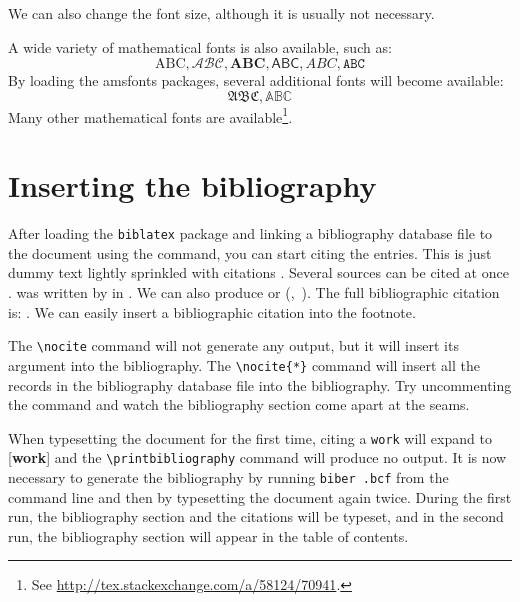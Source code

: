 \documentclass[
  digital, %
  table,   %
%
  lof,     %
  lot,     %
]{fithesis3}
\begin{document}
{\tiny We \scriptsize can \footnotesize also \small change \normalsize
the \large font \Large size, \LARGE although \huge it \Huge
is \huge usually \LARGE not \Large necessary.\normalsize

A wide variety of mathematical fonts is also available, such as: \[
  \mathrm{ABC}, \mathcal{ABC}, \mathbf{ABC}, \mathsf{ABC},
  \mathit{ABC}, \mathtt{ABC}
\] By loading the \textsf{amsfonts} packages, several additional
fonts will become available: \[
  \mathfrak{ABC}, \mathbb{ABC}
\] Many other mathematical fonts are available\footnote{
  See \url{http://tex.stackexchange.com/a/58124/70941}.
}.

\chapter{Inserting the bibliography}
After loading the \texttt{biblatex} package and linking a
bibliography data\-base file to the document using the
\verb"" command, you can start citing the entries.
This is just dummy text \cite{inbook-full} lightly sprinkled with
citations \cite[p.~123]{incollection-full}.  Several sources can be
cited at once \cite{whole-collection, manual-minimal,manual-full}.
 was written by \citeauthor{inbook-full} in
\citeyear{inbook-full}. We can also produce \textcite{inbook-full}
or%
\def\citeauthoryear#1{(\textcite{#1},~\citeyear{#1})}
\citeauthoryear{inbook-full}. The full bibliographic citation is:
\emph{}. We can easily insert a bibliographic
citation into the footnote.

The \verb"\nocite" command will not generate any
output\nocite{booklet-full}, but it will insert its argument into
the bibliography. The \verb"\nocite{*}" command will insert all the
records in the bibliography database file into the bibliography.
Try uncommenting the command
and watch the bibliography section come apart at the seams.

When typesetting the document for the first time, citing a
\texttt{work} will expand to [\textbf{work}] and the
\verb"\printbibliography" command will produce no output. It is now
necessary to generate the bibliography by running \texttt{biber
\jobname.bcf} from the command line and then by typesetting the
document again twice. During the first run, the bibliography
section and the citations will be typeset, and in the second run,
the bibliography section will appear in the table of contents.

}
\end{document}
